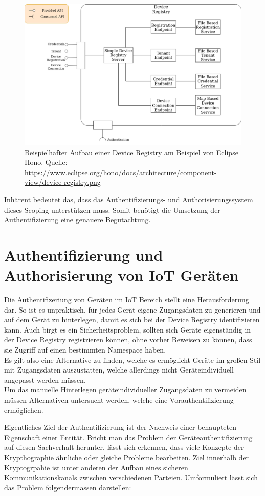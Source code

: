 \begin{figure}
    \centering
    \includegraphics[width=0.75\linewidth]{img/device-registry.png}
    \caption[Bestandteile einer Device Registry]{Beispielhafter Aufbau einer Device Registry am Beispiel von Eclipse Hono. Quelle: \url{https://www.eclipse.org/hono/docs/architecture/component-view/device-registry.png}}
    \label{fig:device_registry}
\end{figure}

Inhärent bedeutet das, dass das Authentifizierungs- und Authorisierungssystem dieses Scoping unterstützen muss. Somit benötigt die Umsetzung der Authentifizierung eine genauere Begutachtung.

\section{Authentifizierung und Authorisierung von IoT Geräten}
\label{sec:auth}

Die Authentifizeriung von Geräten im IoT Bereich stellt eine Herausforderung dar. So ist es unpraktisch, für jedes Gerät eigene Zugangsdaten zu generieren und auf dem Gerät zu hinterlegen, damit es sich bei der Device Registry identifizieren kann. Auch birgt es ein Sicherheitsproblem, sollten sich Geräte eigenständig in der Device Registry registrieren können, ohne vorher Beweisen zu können, dass sie Zugriff auf einen bestimmten Namespace haben. \\
Es gilt also eine Alternative zu finden, welche es ermöglicht Geräte im großen Stil mit Zugangsdaten auszustatten, welche allerdings nicht Geräteindividuell angepasst werden müssen.\\
Um das manuelle Hinterlegen geräteindividueller Zugangsdaten zu vermeiden müssen Alternativen untersucht werden, welche eine Vorauthentifizierung ermöglichen. 

Eigentliches Ziel der Authentifizierung ist der Nachweis einer behaupteten Eigenschaft einer Entität. Bricht man das Problem der Geräteauthentifizierung auf diesen Sachverhalt herunter, lässt sich erkennen, dass viele Konzepte der Krypthographie ähnliche oder gleiche Probleme bearbeiten. Ziel innerhalb der Kryptogrpahie ist unter anderen der Aufbau eines sicheren Kommunikationskanals zwischen verschiedenen Parteien. Umformuliert lässt sich das Problem folgendermassen darstellen:

